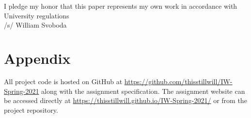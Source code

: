 \documentclass[pageno]{jpaper}
\begin{document}
I pledge my honor that this paper represents my own work in accordance with University regulations \\/s/ William Svoboda




\appendix

\section{Appendix}

All project code is hosted on GitHub at \url{https://github.com/thisstillwill/IW-Spring-2021} along with the assignment specification. The assignment website can be accessed directly at \url{https://thisstillwill.github.io/IW-Spring-2021/} or from the project repository.
\end{document}
